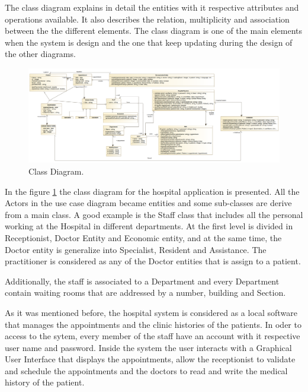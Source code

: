 \documentclass{article}
\begin{document}
            The class diagram explains in detail the entities with it respective attributes and operations available. It also describes the relation, multiplicity and
            association between the the different elements. The class diagram is one of the main elements when the system is design and the one that keep updating during the 
            design of the other diagrams.


            \begin{figure}[H]
                \centering 
                \includegraphics[width=1\linewidth]{./img/class.png}
                \caption{Class Diagram.}
                \label{fig:class}
            \end{figure}

            In the figure \ref{fig:class} the class diagram for the hospital application is presented. All the Actors in the use case diagram became entities and some sub-classes are derive from a main class.
            A good example is the Staff class that includes all the personal working at the Hospital in different departments. At the first level is divided in Receptionist, Doctor Entity and Economic entity, and at the same time,
            the Doctor entity is generalize into Specialist, Resident and Assistance. The practitioner is considered as any of the Doctor entities that is assign to a patient.

            Additionally, the staff is associated to a Department and every Department contain waiting rooms that are addressed by a number, building and Section.

            As it was mentioned before, the hospital system is considered as a local software that manages the appointments and the clinic histories of the patients. In oder to access to the sytem, every member of the staff have an account with
            it respective user name and password. Inside the system the user interacts with a Graphical User Interface that displays the appointments, allow the receptionist to validate and schedule the appointments and the doctors to read and write the
            medical history of the patient. 
\end{document}

